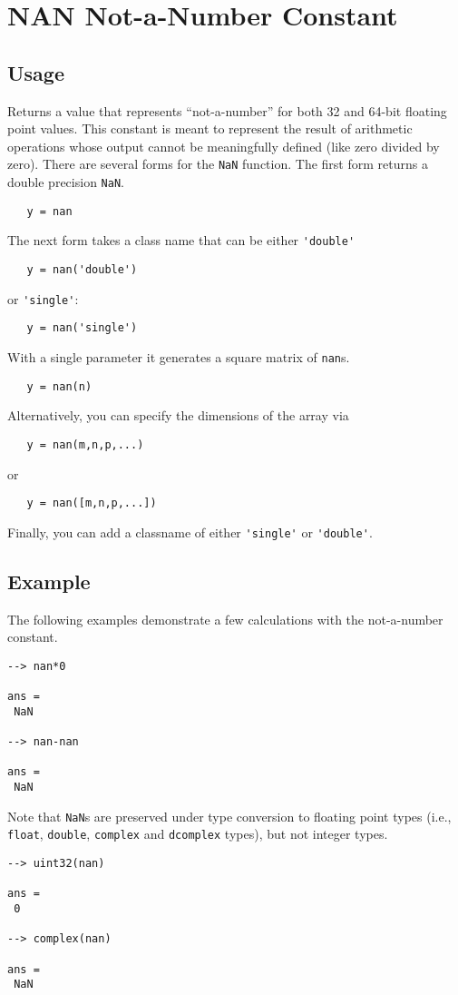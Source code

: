\section{NAN Not-a-Number Constant}

\subsection{Usage}

Returns a value that represents ``not-a-number'' for both 32 and 64-bit 
floating point values.  This constant is meant to represent the result of
arithmetic operations whose output cannot be meaningfully defined (like 
zero divided by zero).  There are several forms for the \verb|NaN| function.
The first form returns a double precision \verb|NaN|.
\begin{verbatim}
   y = nan
\end{verbatim}
The next form takes a class name that can be either \verb|'double'| 
\begin{verbatim}
   y = nan('double')
\end{verbatim}
or \verb|'single'|:
\begin{verbatim}
   y = nan('single')
\end{verbatim}
With a single parameter it generates a square matrix of \verb|nan|s.
\begin{verbatim}
   y = nan(n)
\end{verbatim}
Alternatively, you can specify the dimensions of the array via
\begin{verbatim}
   y = nan(m,n,p,...)
\end{verbatim}
or
\begin{verbatim}
   y = nan([m,n,p,...])
\end{verbatim}
Finally, you can add a classname of either \verb|'single'| or \verb|'double'|.
\subsection{Example}

The following examples demonstrate a few calculations with the not-a-number constant.
\begin{verbatim}
--> nan*0

ans = 
 NaN 

--> nan-nan

ans = 
 NaN 
\end{verbatim}
Note that \verb|NaN|s are preserved under type conversion to floating point types (i.e., \verb|float|, \verb|double|, \verb|complex| and \verb|dcomplex| types), but not integer  types.
\begin{verbatim}
--> uint32(nan)

ans = 
 0 

--> complex(nan)

ans = 
 NaN 
\end{verbatim}
